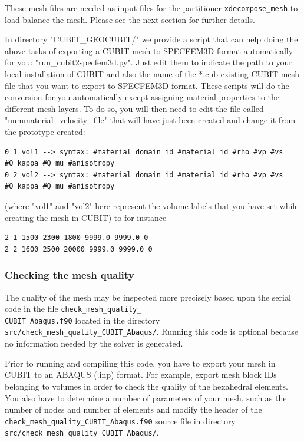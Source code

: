 These mesh files are needed as input files for the partitioner \texttt{xdecompose\_mesh}
to load-balance the mesh. Please see the next section for further
details.

In directory "CUBIT\_GEOCUBIT/" we provide a script that can help doing the above tasks of exporting a CUBIT mesh
to SPECFEM3D format automatically for you: "run\_cubit2specfem3d.py".
Just edit them to indicate the path to your local installation of CUBIT and also the name of the *.cub existing CUBIT mesh file
that you want to export to SPECFEM3D format. These scripts will do the conversion for you automatically except assigning material properties
to the different mesh layers. To do so, you will then need to edit the file
called "nummaterial\_velocity\_file" that will have just been created and change it from the prototype created:

{\footnotesize
\begin{verbatim}
0 1 vol1 --> syntax: #material_domain_id #material_id #rho #vp #vs #Q_kappa #Q_mu #anisotropy
0 2 vol2 --> syntax: #material_domain_id #material_id #rho #vp #vs #Q_kappa #Q_mu #anisotropy
\end{verbatim}
}
\noindent
(where "vol1" and "vol2" here represent the volume labels that you have set while creating the mesh in CUBIT)
to for instance

{\footnotesize
\begin{verbatim}
2 1 1500 2300 1800 9999.0 9999.0 0
2 2 1600 2500 20000 9999.0 9999.0 0
\end{verbatim}
}

\subsubsection*{Checking the mesh quality}

The quality of the mesh may be inspected more precisely based upon
the serial code in the file \texttt{check\_mesh\_quality\_}~\\
 \texttt{CUBIT\_Abaqus.f90} located in the directory \texttt{src/check\_mesh\_quality\_CUBIT\_Abaqus/}.
Running this code is optional because no information needed by the
solver is generated.

Prior to running and compiling this code, you have to export your
mesh in CUBIT to an ABAQUS (.inp) format. For example, export mesh
block IDs belonging to volumes in order to check the quality of the
hexahedral elements. You also have to determine a number of parameters
of your mesh, such as the number of nodes and number of elements and
modify the header of the \texttt{check\_mesh\_quality\_CUBIT\_Abaqus.f90}
source file in directory \texttt{src/check\_mesh\_quality\_CUBIT\_Abaqus/}.

